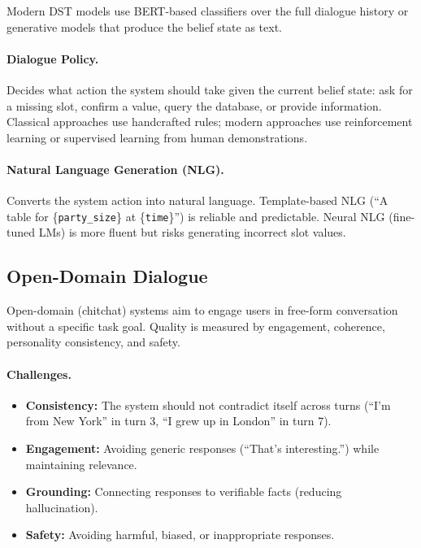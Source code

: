 Modern DST models use BERT-based classifiers over the full dialogue history or generative
models that produce the belief state as text.

\paragraph{Dialogue Policy.}
Decides what action the system should take given the current belief state: ask for a missing
slot, confirm a value, query the database, or provide information.  Classical approaches use
handcrafted rules; modern approaches use reinforcement learning or supervised learning from
human demonstrations.

\paragraph{Natural Language Generation (NLG).}
Converts the system action into natural language.  Template-based NLG (``A table for
\{\texttt{party\_size}\} at \{\texttt{time}\}'') is reliable and predictable.  Neural NLG
(fine-tuned LMs) is more fluent but risks generating incorrect slot values.

\subsection{Open-Domain Dialogue}

Open-domain (chitchat) systems aim to engage users in free-form conversation without a
specific task goal.  Quality is measured by engagement, coherence, personality consistency,
and safety.

\paragraph{Challenges.}
\begin{itemize}
    \item \textbf{Consistency:} The system should not contradict itself across turns (``I'm
          from New York'' in turn 3, ``I grew up in London'' in turn 7).
    \item \textbf{Engagement:} Avoiding generic responses (``That's interesting.'') while
          maintaining relevance.
    \item \textbf{Grounding:} Connecting responses to verifiable facts (reducing hallucination).
    \item \textbf{Safety:} Avoiding harmful, biased, or inappropriate responses.
\end{itemize}

